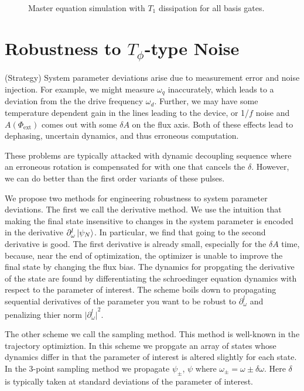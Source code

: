 \documentclass[
  amsfonts,
  amsmath,
  tbtags,
  amssymb,
  aps,
  nobibnotes,
  prl,
  twocolumn,
]{revtex4-2}
\begin{document}
\begin{figure}[ht]
\begin{subfigure}{.33\textwidth}
    \label{fig:sub-third}
  \end{subfigure}
  \caption{Master equation simulation with $T_{1}$ dissipation for all basis gates.}
  \label{fig:fig}
\end{figure}


\section{Robustness to $T_{\phi}$-type Noise}
(Strategy) System parameter deviations arise due to
measurement error and noise injection. For example,
we might measure $\omega_{q}$ inaccurately,
which leads to a deviation from
the the drive frequency $\omega_{d}$.
Further, we may have some temperature dependent gain
in the lines leading to the device, or 1/$f$ noise
and $A(\Phi_{\textrm{ext}})$ comes out with some
$\delta A$ on the flux axis.
Both of these effects lead to dephasing,
uncertain dynamics, and thus erroneous computation.

These problems are typically attacked with dynamic decoupling
sequence where an erroneous rotation is compensated for with
one that cancels the $\delta$. However, we can do better
than the first order variants of these pulses.

We propose two methods for engineering robustness
to system parameter deviations. The first we call the
derivative method. We use the intuition that
making the final state insensitive to changes
in the system parameter is encoded in the derivative
$\partial_{\omega}^{l} \ket{\psi_{N}}$.
In particular, we find that going to the second
derivative is good. The first derivative is already
small, especially for the $\delta A$ time, because,
near the end of optimization, the
optimizer is unable to improve the final state by
changing the flux bias.
The dynamics for propgating the derivative of the state
are found by differentiating the schroedinger equation
dynamics with respect to the parameter of interest.
The scheme boils down to propagating sequential
derivatives of the parameter you want to be
robust to $\partial_{\omega}^{l}$ and penalizing thier norm
${\lvert \partial_{\omega}^{l} \lvert}^{2}$.

The other scheme we call the sampling method. This method
is well-known in the trajectory optimiztion. In this scheme
we propgate an array of states whose dynamics differ
in that the parameter of interest is altered slightly
for each state. In the 3-point sampling method we
propagate $\psi_{\pm}$, $\psi$ where
$\omega_{\pm} = \omega \pm \delta \omega$. Here $\delta$ is
typically taken at standard deviations of the parameter
of interest.
\end{document}
